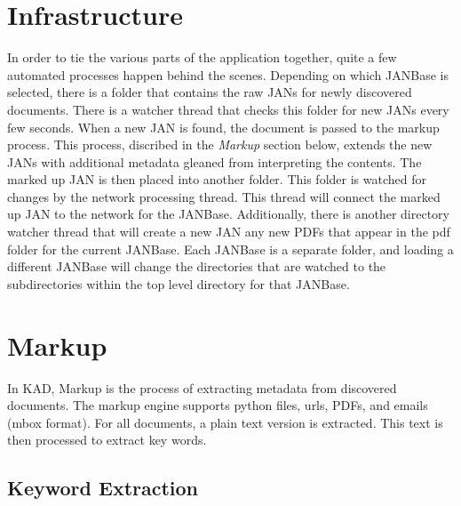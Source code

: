 \documentclass{article}
\begin{document}
\begin{doublespace}
\section{Infrastructure}
In order to tie the various parts of the application together,
quite a few automated processes happen behind the scenes.
Depending on which JANBase is selected, there is a folder that contains the raw JANs for newly discovered documents.
There is a watcher thread that checks this folder for new JANs every few seconds.
When a new JAN is found, the document is passed to the markup process.
This process, discribed in the {\it Markup} section below, extends the new JANs with additional metadata gleaned
from interpreting the contents.
The marked up JAN is then placed into another folder.
This folder is watched for changes by the network processing thread.
This thread will connect the marked up JAN to the network for the JANBase.
Additionally, there is another directory watcher thread that will create a new JAN any new PDFs that appear in
the pdf folder for the current JANBase.
Each JANBase is a separate folder, and loading a different JANBase will change the directories that are watched
to the subdirectories within the top level directory for that JANBase. 
\section{Markup}
In KAD, Markup is the process of extracting metadata from discovered documents.
The markup engine supports python files, urls, PDFs, and emails (mbox format).
For all documents, a plain text version is extracted.
This text is then processed to extract key words.
\subsection{Keyword Extraction}

\end{doublespace}
\end{document}
